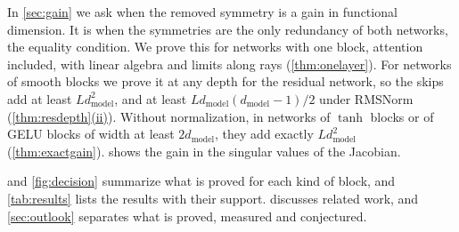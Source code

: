 \documentclass[10pt]{article}
\theoremstyle{definition}
\theoremstyle{remark}
\newcommand{\dm}{d_{\mathrm{model}}}
\DeclareRobustCommand{\cpref}[2]{\hyperref[#1:#2]{\cref*{#1}(#2)}}
\begin{document}
In \cref{sec:gain} we ask when the removed symmetry is a gain in functional dimension. It is when the symmetries are the only redundancy of both networks, the equality condition. We prove this for networks with one block, attention included, with linear algebra and limits along rays (\cref{thm:onelayer}). For networks of smooth blocks we prove it at any depth for the residual network, so the skips add at least $L\dm^2$, and at least $L\dm(\dm-1)/2$ under RMSNorm (\cpref{thm:resdepth}{ii}). Without normalization, in networks of $\tanh$ blocks or of GELU blocks of width at least $2\dm$, they add exactly $L\dm^2$ (\cref{thm:exactgain}).  shows the gain in the singular values of the Jacobian.

 and \cref{fig:decision} summarize what is proved for each kind of block, and \cref{tab:results} lists the results with their support.  discusses related work, and \cref{sec:outlook} separates what is proved, measured and conjectured.
\end{document}
